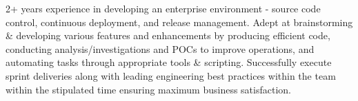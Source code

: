 

\begin{cvparagraph}

2+ years experience in developing an enterprise environment - source code control, continuous deployment, and release management. Adept at brainstorming & developing various features and enhancements by producing efficient
code, conducting analysis/investigations and POCs to improve operations, and automating tasks through appropriate tools & scripting. Successfully execute sprint deliveries along with leading engineering best practices within the team
within the stipulated time ensuring maximum business satisfaction.
\end{cvparagraph}
